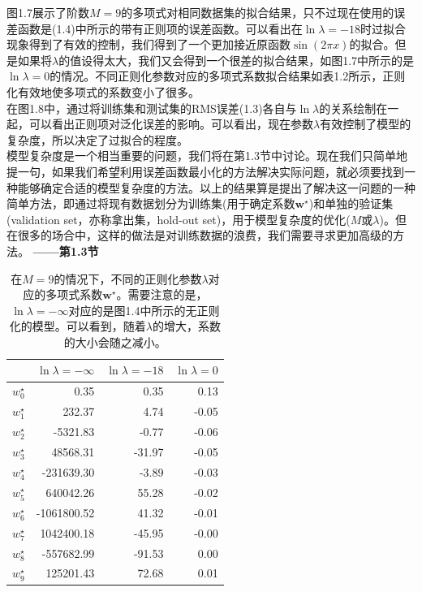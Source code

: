 \documentclass[b5paper]{book}
\numberwithin{equation}{chapter}
\begin{document}
{	\indent 图1.7展示了阶数$M=9$的多项式对相同数据集的拟合结果，只不过现在使用的误差函数是(1.4)中所示的带有正则项的误差函数。可以看出在$\ln \lambda = -18$时过拟合现象得到了有效的控制，我们得到了一个更加接近原函数$\sin (2 \pi x)$的拟合。但是如果将$\lambda$的值设得太大，我们又会得到一个很差的拟合结果，如图1.7中所示的是$\ln \lambda = 0$的情况。不同正则化参数对应的多项式系数拟合结果如表1.2所示，正则化有效地使多项式的系数变小了很多。\\
	\indent 在图1.8中，通过将训练集和测试集的RMS误差(1.3)各自与$\ln \lambda$的关系绘制在一起，可以看出正则项对泛化误差的影响。可以看出，现在参数$\lambda$有效控制了模型的复杂度，所以决定了过拟合的程度。\\
	\indent 模型复杂度是一个相当重要的问题，我们将在第1.3节中讨论。现在我们只简单地提一句，如果我们希望利用误差函数最小化的方法解决实际问题，就必须要找到一种能够确定合适的模型复杂度的方法。以上的结果算是提出了解决这一问题的一种简单方法，即通过将现有数据划分为训练集(用于确定系数$\mathbf{w^\star}$)和单独的验证集(validation set，亦称拿出集，hold-out set)，用于模型复杂度的优化($M$或$\lambda$)。但在很多的场合中，这样的做法是对训练数据的浪费，我们需要寻求更加高级的方法。\color{red} \textbf{——第1.3节}　\color{black}\\
	\begin{table}
		\centering
		\begin{tabular}{c|rrr}
			\ & $\ln \lambda = - \infty $ & $\ln \lambda = -18$ & $\ln \lambda = 0$ \\
			\hline
			$w_0^\star$ & 0.35 & 0.35 & 0.13 \\
			$w_1^\star$ & 232.37  & 4.74 & -0.05 \\
			$w_2^\star$ & -5321.83  & -0.77  & -0.06 \\
			$w_3^\star$ & 48568.31  & -31.97  & -0.05 \\
			$w_4^\star$ & -231639.30  & -3.89  & -0.03  \\
			$w_5^\star$ & 640042.26  & 55.28  & -0.02  \\
			$w_6^\star$ & -1061800.52  & 41.32  & -0.01  \\
			$w_7^\star$ & 1042400.18  & -45.95  & -0.00  \\
			$w_8^\star$ & -557682.99  & -91.53  & 0.00  \\
			$w_9^\star$ & 125201.43  & 72.68  & 0.01  \\
		\end{tabular}
		\caption{在$M=9$的情况下，不同的正则化参数$\lambda$对应的多项式系数$\mathbf{w^\star}$。需要注意的是，$\ln \lambda = - \infty$对应的是图1.4中所示的无正则化的模型。可以看到，随着$\lambda$的增大，系数的大小会随之减小。}

\end{table}}
\end{document}
